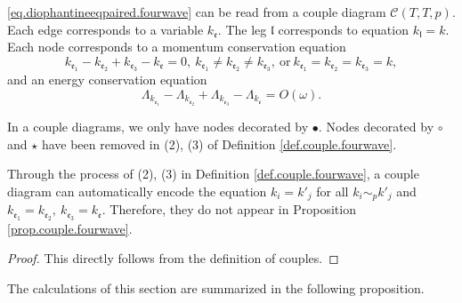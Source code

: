  
 \begin{prop}\label{prop.couple.fourwave}
 \eqref{eq.diophantineeqpaired.fourwave} can be read from a couple diagram $\mathcal{C}(T,T,p)$. Each edge corresponds to a variable $k_{\mathfrak{e}}$. The leg $\mathfrak{l}$ corresponds to equation $k_{\mathfrak{l}}=k$. Each node corresponds to a momentum conservation equation
 \begin{equation}
  k_{\mathfrak{e}_1}-k_{\mathfrak{e}_2}+k_{\mathfrak{e}_3}-k_{\mathfrak{e}}=0,\ k_{\mathfrak{e}_1}\ne k_{\mathfrak{e}_2}\ne k_{\mathfrak{e}_3},\ \text{or}\ k_{\mathfrak{e}_1}= k_{\mathfrak{e}_2}= k_{\mathfrak{e}_3}=k,
 \end{equation} 
 and an energy conservation equation 
 \begin{equation}
  \Lambda_{k_{\mathfrak{e}_1}}-\Lambda_{k_{\mathfrak{e}_2}}+\Lambda_{k_{\mathfrak{e}_3}}-\Lambda_{k_{\mathfrak{e}}} = O(\omega).
 \end{equation} 
 \end{prop}
 \begin{rem}
 In a couple diagrams, we only have nodes decorated by $\bullet$. Nodes decorated by $\circ$ and $\star$ have been removed in (2), (3) of Definition \ref{def.couple.fourwave}.
 \end{rem}
 \begin{rem}
 Through the process of (2), (3) in Definition \ref{def.couple.fourwave}, a couple diagram can automatically encode the equation $k_{i}=k'_{j}$ for all $k_{i}\sim_{p}k'_{j}$ and $k_{\mathfrak{e}_1}=k_{\mathfrak{e}_2},\ k_{\mathfrak{e}_3}=k_{\mathfrak{e}}$. Therefore, they do not appear in Proposition \ref{prop.couple.fourwave}.
 \end{rem}
 
 \begin{proof}
 This directly follows from the definition of couples. 
 \end{proof}
 
 The calculations of this section are summarized in the following proposition. 
 
